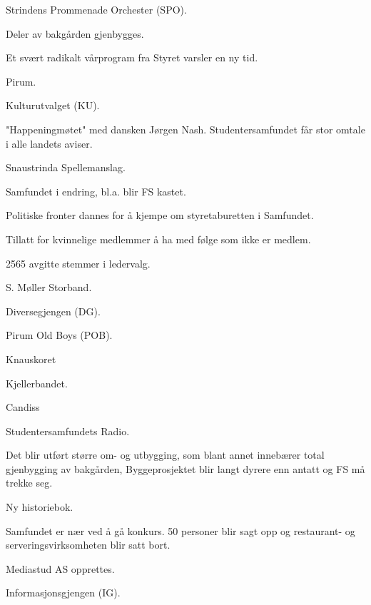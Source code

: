 \documentclass[fsbok.tex]{subfiles}
\begin{document}
  \item Strindens Prommenade Orchester (SPO).
  \item Deler av bakgården gjenbygges.
\yearend 

  \item Et svært radikalt vårprogram fra Styret varsler en ny tid.
  \item Pirum.
\yearend 

  \item Kulturutvalget (KU). 
\yearend 

  \item "Happeningmøtet" med dansken Jørgen Nash. Studentersamfundet får stor omtale i alle landets aviser.
  \item Snaustrinda Spellemanslag.
\yearend 

  \item Samfundet i endring, bl.a. blir FS kastet.
  \item Politiske fronter dannes for å kjempe om styretaburetten i Samfundet. 
\yearend 

  \item Tillatt for kvinnelige medlemmer å ha med følge som ikke er medlem.
\yearend 

  \item 2565 avgitte stemmer i ledervalg.
  \item S. Møller Storband.
\yearend 

  \item Diversegjengen (DG).
\yearend 

  \item Pirum Old Boys (POB).
  \item Knauskoret
  \item Kjellerbandet.
\yearend 

  \item Candiss
\yearend 

  \item Studentersamfundets Radio.
\yearend 

  \item Det blir utført større om- og utbygging, som blant annet innebærer total gjenbygging av bakgården,
Byggeprosjektet blir langt dyrere enn antatt og FS må trekke seg.
  \item Ny historiebok.
\yearend 

  \item Samfundet er nær ved å gå konkurs. 50 personer blir sagt opp og restaurant- og serveringsvirksomheten blir satt
bort.
  \item Mediastud AS opprettes.
  \item Informasjonsgjengen (IG). 
\yearend 
\end{document}
